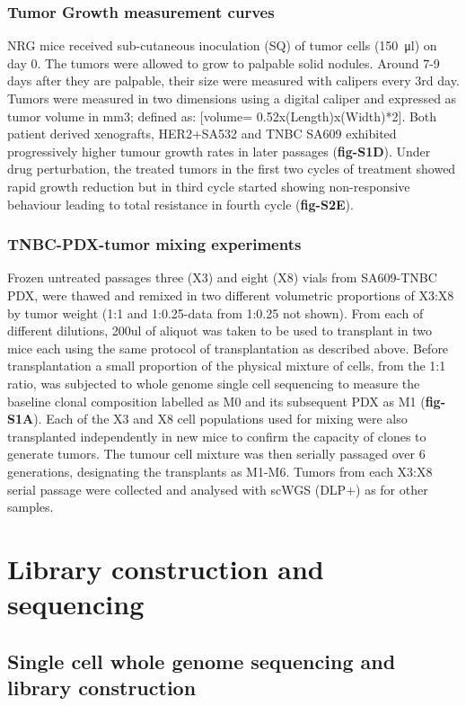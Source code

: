 \documentclass{article}
\begin{document}
\subsubsection{Tumor Growth measurement curves} 
NRG mice received sub-cutaneous inoculation (SQ) of tumor cells (\SI{150}{\ul}) on day 0. 
The tumors were allowed to grow to palpable solid nodules.
Around 7-9 days after they are palpable, their size were measured with calipers every 3rd day. 
Tumors were measured in two dimensions using a digital caliper and expressed as tumor volume in mm3; defined as: [volume= 0.52x(Length)x(Width)*2].
Both patient derived xenografts, HER2+SA532 and TNBC SA609 exhibited progressively higher tumour growth rates in later passages (\textbf{fig-S1D}). Under drug perturbation, the treated tumors in the first two cycles of treatment showed rapid growth reduction but in third cycle started showing non-responsive behaviour leading to total resistance in fourth cycle (\textbf{fig-S2E}).

\subsubsection{TNBC-PDX-tumor mixing experiments}
Frozen untreated passages three (X3) and eight (X8) vials from SA609-TNBC PDX, were thawed and  remixed in two different volumetric proportions of X3:X8 by tumor weight (1:1 and 1:0.25-data from 1:0.25 not shown). From each of different dilutions, 200ul of aliquot was taken to be used to transplant in two mice each using the same protocol of transplantation as described above. Before transplantation a small proportion of the physical mixture of cells, from the 1:1 ratio, was subjected to whole genome single cell sequencing to measure the baseline clonal composition labelled as M0 and its subsequent PDX as M1 (\textbf{fig-S1A}).
Each of the X3 and X8 cell populations used for mixing were also transplanted independently in new mice to confirm the capacity of clones to generate tumors. The tumour cell mixture was then serially passaged over 6 generations, designating the transplants as M1-M6. Tumors from each X3:X8 serial passage were collected and analysed with scWGS (DLP+) as for other samples.




\section{Library construction and sequencing}

\subsection{Single cell whole genome sequencing and library construction}
\end{document}
